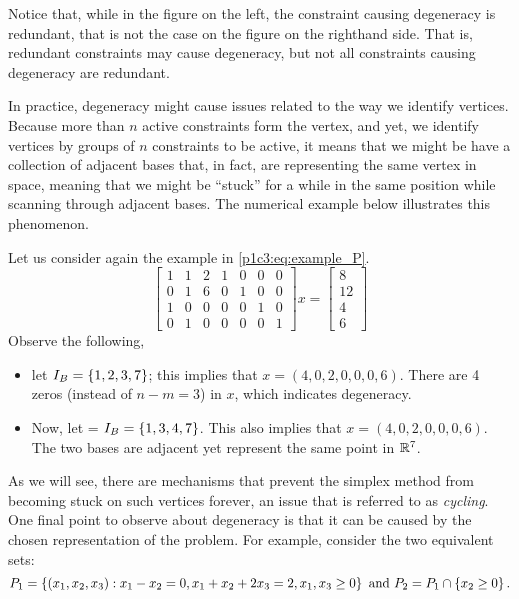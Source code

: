 Notice that, while in the figure on the left, the constraint causing degeneracy is redundant, that is not the case on the figure on the righthand side. That is, redundant constraints may cause degeneracy, but not all constraints causing degeneracy are redundant.

In practice, degeneracy might cause issues related to the way we identify vertices. Because more than $n$ active constraints form the vertex, and yet, we identify vertices by groups of $n$ constraints to be active, it means that we might be have a collection of adjacent bases that, in fact, are representing the same vertex in space, meaning that we might be ``stuck'' for a while in the same position while scanning through adjacent bases. The numerical example below illustrates this phenomenon. 

Let us consider again the example in \eqref{p1c3:eq:example_P}. 
%
\begin{equation*}
	\begin{bmatrix}
		1 & 1 & 2 & 1 & 0 & 0 & 0 \\
		0 & 1 & 6 & 0 & 1 & 0 & 0 \\
		1 & 0 & 0 & 0 & 0 & 1 & 0 \\
		0 & 1 & 0 & 0 & 0 & 0 & 1
	\end{bmatrix} 
	x =
	\begin{bmatrix}
		8  \\
		12 \\
		4  \\
		6   	
	\end{bmatrix}
\end{equation*}
%
Observe the following, 
%
\begin{itemize}
	\item let $I_B = \left\{ 1,2,3,7 \right \}$; this implies that $x = (4,0,2,0,0,0,6)$. There are 4 zeros (instead of $n-m=3$) in $x$, which indicates degeneracy. 
	\item Now, let = $I_B = \left\{ 1,3,4,7 \right \}$. This also implies that $x = (4,0,2,0,0,0,6)$. The two bases are adjacent yet represent the same point in $\mathbb{R}^7$.	
\end{itemize}
%
As we will see, there are mechanisms that prevent the simplex method from becoming stuck on such vertices forever, an issue that is referred to as \emph{cycling}. One final point to observe about degeneracy is that it can be caused by the chosen representation of the problem. For example, consider the two equivalent sets:
%
\begin{equation*}
	P_1 = \left\{ (x_1, x_2,x_3) : x_1 - x_2 = 0, x_1 + x_2 + 2x_3 = 2, x_1, x_3 \geq 0 \right \} \text { and } P_2 = P_1 \cap \left\{ x_2 \geq 0 \right \}. 
\end{equation*}	
